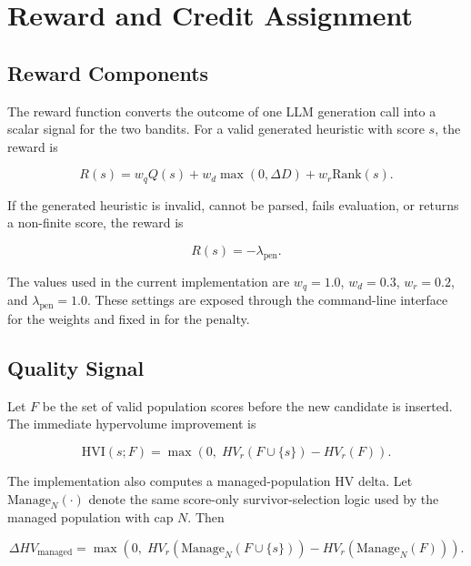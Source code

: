 \section{Reward and Credit Assignment}

\subsection{Reward Components}

The reward function converts the outcome of one LLM generation call into a scalar signal for the two bandits. For a valid generated heuristic with score $s$, the reward is

\begin{equation}
  R(s)
  =
  w_q Q(s)
  +
  w_d \max(0,\Delta D)
  +
  w_r \mathrm{Rank}(s).
  \label{eq:reward}
\end{equation}

If the generated heuristic is invalid, cannot be parsed, fails evaluation, or returns a non-finite score, the reward is

\begin{equation}
  R(s) = -\lambda_{\mathrm{pen}}.
\end{equation}

The values used in the current implementation are $w_q=1.0$, $w_d=0.3$, $w_r=0.2$, and $\lambda_{\mathrm{pen}}=1.0$. These settings are exposed through the command-line interface for the weights and fixed in  for the penalty.

\subsection{Quality Signal}

Let $F$ be the set of valid population scores before the new candidate is inserted. The immediate hypervolume improvement is

\begin{equation}
  \mathrm{HVI}(s;F)
  =
  \max\left(0,\;HV_r(F\cup\{s\})-HV_r(F)\right).
\end{equation}

The implementation also computes a managed-population HV delta. Let $\mathrm{Manage}_N(\cdot)$ denote the same score-only survivor-selection logic used by the managed population with cap $N$. Then

\begin{equation}
  \Delta HV_{\mathrm{managed}}
  =
  \max\left(
    0,\;
    HV_r(\mathrm{Manage}_N(F\cup\{s\}))
    -
    HV_r(\mathrm{Manage}_N(F))
  \right).
  \label{eq:managed-hv}
\end{equation}

